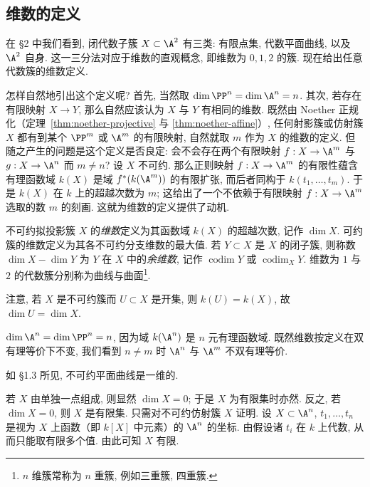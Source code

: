 \subsection{维数的定义}

在 §2 中我们看到, 闭代数子簇 $X \subset \A^2$ 有三类: 有限点集, 代数平面曲线, 以及 $\A^2$ 自身. 这一三分法对应于维数的直观概念, 即维数为 $0, 1, 2$ 的簇. 现在给出任意代数簇的维数定义.

怎样自然地引出这个定义呢? 首先, 当然取 $\dim \PP^n = \dim \A^n = n$. 其次, 若存在有限映射 $X \to Y$, 那么自然应该认为 $X$ 与 $Y$ 有相同的维数. 既然由 Noether 正规化（定理~\ref{thm:noether-projective} 与 \ref{thm:noether-affine}）, 任何射影簇或仿射簇 $X$ 都有到某个 $\PP^m$ 或 $\A^m$ 的有限映射, 自然就取 $m$ 作为 $X$ 的维数的定义. 但随之产生的问题是这个定义是否良定: 会不会存在两个有限映射 $f: X \to \A^m$ 与 $g: X \to \A^n$ 而 $m \ne n$? 设 $X$ 不可约. 那么正则映射 $f: X \to \A^m$ 的有限性蕴含有理函数域 $k(X)$ 是域 $f^*(k(\A^m))$ 的有限扩张, 而后者同构于 $k(t_1, \ldots, t_m)$. 于是 $k(X)$ 在 $k$ 上的超越次数为 $m$; 这给出了一个不依赖于有限映射 $f: X \to \A^m$ 选取的数 $m$ 的刻画. 这就为维数的定义提供了动机.

\begin{definition}[维数]\label{def:dimension}
	不可约拟投影簇 $X$ 的\emph{维数}定义为其函数域 $k(X)$ 的超越次数, 记作 $\dim X$. 可约簇的维数定义为其各不可约分支维数的最大值. 若 $Y \subset X$ 是 $X$ 的闭子簇, 则称数 $\dim X - \dim Y$ 为 $Y$ 在 $X$ 中的\emph{余维数}, 记作 $\operatorname{codim} Y$ 或 $\operatorname{codim}_X Y$. 维数为 $1$ 与 $2$ 的代数簇分别称为曲线与曲面\footnote{$n$ 维簇常称为 $n$ 重簇, 例如三重簇, 四重簇.}.
\end{definition}

注意, 若 $X$ 是不可约簇而 $U \subset X$ 是开集, 则 $k(U) = k(X)$, 故 $\dim U = \dim X$.

\begin{example}\label{exam:dim-affine-space}
	$\dim \A^n = \dim \PP^n = n$, 因为域 $k(\A^n)$ 是 $n$ 元有理函数域. 既然维数按定义在双有理等价下不变, 我们看到 $n \ne m$ 时 $\A^n$ 与 $\A^m$ 不双有理等价.
\end{example}

\begin{example}\label{exam:dim-curve}
	如 §1.3 所见, 不可约平面曲线是一维的.
\end{example}

\begin{example}\label{exam:dim-zero}
	若 $X$ 由单独一点组成, 则显然 $\dim X = 0$; 于是 $X$ 为有限集时亦然. 反之, 若 $\dim X = 0$, 则 $X$ 是有限集. 只需对不可约仿射簇 $X$ 证明. 设 $X \subset \A^n$, $t_1, \ldots, t_n$ 是视为 $X$ 上函数（即 $k[X]$ 中元素）的 $\A^n$ 的坐标. 由假设诸 $t_i$ 在 $k$ 上代数, 从而只能取有限多个值. 由此可知 $X$ 有限.
\end{example}


